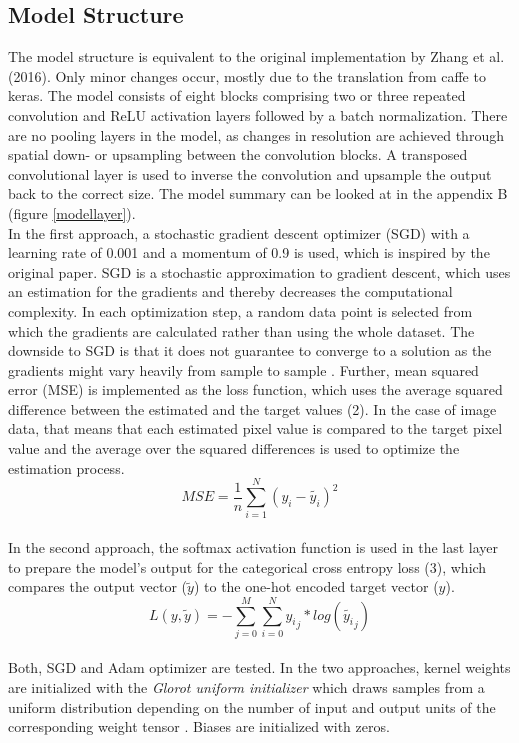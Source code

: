 \documentclass[12pt,letterpaper]{article}
\begin{document}
\subsection{Model Structure}
The model structure is equivalent to the original implementation by Zhang et al. (2016). Only minor changes occur, mostly due to the translation from caffe to keras. The model consists of eight blocks comprising two or three repeated convolution and ReLU activation layers followed by a batch normalization. There are no pooling layers in the model, as changes  in  resolution  are  achieved  through  spatial  down-  or  upsampling between the convolution blocks. A transposed convolutional layer is used to inverse the convolution and upsample the output back to the correct size. The model summary can be looked at in the appendix B (figure \ref{modellayer}).\\
In the first approach, a stochastic gradient descent optimizer (SGD) with a learning rate of 0.001 and a momentum of 0.9 is used, which is inspired by the original paper. SGD is a stochastic approximation to gradient descent, which uses an estimation for the gradients and thereby decreases the computational complexity. In each optimization step, a random data point is selected from which the gradients are calculated rather than using the whole dataset. The downside to SGD is that it does not guarantee to converge to a solution as the gradients might vary heavily from sample to sample \citep{Lecture.2019}. Further,  mean squared error (MSE) is implemented as the loss function, which uses the average squared difference between the estimated and the target values (2). In the case of image data, that means that each estimated pixel value is compared to the target pixel value and the average over the squared differences is used to optimize the estimation process.
\begin{equation}
MSE = \frac{1}{n}\sum_{i=1}^N(y_i - \tilde{y_i})^2
\end{equation}
\\
In the second approach, the softmax activation function is used in the last layer to prepare the model’s output for the categorical cross entropy loss (3), which compares the output vector ($\tilde{y}$) to the one-hot encoded target vector ($y$).
\begin{equation}
L(y,\tilde{y}) = -\sum_{j=0}^M \sum_{i=0}^N
{{y_i}_j}*log({\tilde{y_i}_j})
\end{equation}
\\
Both, SGD and Adam optimizer are tested. In the two approaches, kernel weights are initialized with the \emph{Glorot uniform initializer} which draws samples from a uniform distribution depending on the number of input and output units of the corresponding weight tensor \citep{Glorot2010}. Biases are initialized with zeros.
\end{document}
